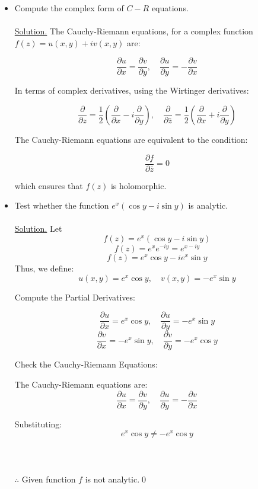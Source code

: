 \documentclass{article}
\begin{document}
\begin{itemize}
    \item Compute the complex form of $C-R$ equations.
    \\
    \\
    \underline{Solution.} 
The Cauchy-Riemann equations, for a complex function \( f(z) = u(x,y) + i v(x,y) \) are:

\[
\frac{\partial u}{\partial x} = \frac{\partial v}{\partial y}, \quad \frac{\partial u}{\partial y} = -\frac{\partial v}{\partial x}
\]

In terms of complex derivatives, using the Wirtinger derivatives:

\[
\frac{\partial}{\partial z} = \frac{1}{2} \left( \frac{\partial}{\partial x} - i \frac{\partial}{\partial y} \right), \quad
\frac{\partial}{\partial \bar{z}} = \frac{1}{2} \left( \frac{\partial}{\partial x} + i \frac{\partial}{\partial y} \right)
\]

The Cauchy-Riemann equations are equivalent to the condition:

\[
\frac{\partial f}{\partial \bar{z}} = 0
\]

which ensures that \( f(z) \) is holomorphic.
\item Test whether the function $e^x(\cos y-i\sin y)$ is analytic.
\\
\\
\underline{Solution.} 
Let
\[
f(z) = e^x (\cos y - i \sin y)
\]
\[
f(z) = e^x e^{-i y} = e^{x - i y}
\]
\[
f(z) = e^x \cos y - i e^x \sin y
\]
Thus, we define:
\[
u(x, y) = e^x \cos y, \quad v(x, y) = -e^x \sin y
\]

Compute the Partial Derivatives:

\[
\frac{\partial u}{\partial x} = e^x \cos y, \quad \frac{\partial u}{\partial y} = -e^x \sin y
\]
\[
\frac{\partial v}{\partial x} = -e^x \sin y, \quad \frac{\partial v}{\partial y} = -e^x \cos y
\]

Check the Cauchy-Riemann Equations:

The Cauchy-Riemann equations are:
\[
\frac{\partial u}{\partial x} = \frac{\partial v}{\partial y}, \quad \frac{\partial u}{\partial y} = -\frac{\partial v}{\partial x}
\]

Substituting:
\[
e^x \cos y \neq -e^x \cos y
\]
\\
\\
\\
$\therefore$ Given function $f$ is not analytic.\qed
\end{itemize}
\newpage
\end{document}
